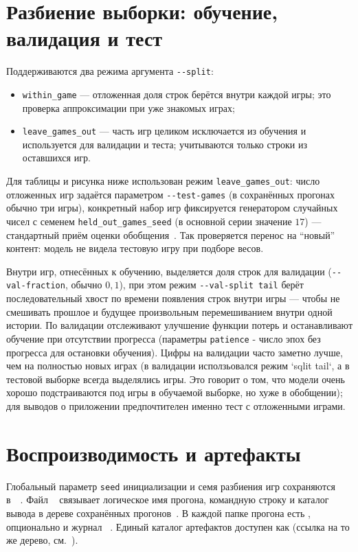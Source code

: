 \section{Разбиение выборки: обучение, валидация и тест}

Поддерживаются два режима аргумента \texttt{-{}-split}:

\begin{itemize}
	\item \texttt{within\_game} --- отложенная доля строк берётся внутри каждой игры; это проверка аппроксимации при уже знакомых играх;
	\item \texttt{leave\_games\_out} --- часть игр целиком исключается из обучения и используется для валидации и теста; учитываются только строки из оставшихся игр.
\end{itemize}

Для таблицы и рисунка ниже использован режим \texttt{leave\_games\_out}: число отложенных игр задаётся параметром \texttt{-{}-test-games} (в сохранённых прогонах обычно три игры), конкретный набор игр фиксируется генератором случайных чисел с семенем \texttt{held\_out\_games\_seed} (в основной серии значение $17$) --- стандартный приём оценки обобщения~\cite{nikolenko2018}. Так проверяется перенос на ``новый'' контент: модель не видела тестовую игру при подборе весов.

Внутри игр, отнесённых к обучению, выделяется доля строк для валидации (\texttt{-{}-val-fraction}, обычно $0{,}1$), при этом режим \texttt{-{}-val-split tail} берёт последовательный хвост по времени появления строк внутри игры --- чтобы не смешивать прошлое и будущее произвольным перемешиванием внутри одной истории. По валидации отслеживают улучшение функции потерь и останавливают обучение при отсутствии прогресса (параметры \texttt{patience} - число эпох без прогресса для остановки обучения). Цифры на валидации часто заметно лучше, чем на полностью новых играх (в валидации исползьовался режим `sqlit tail`, а в тестовой выборке всегда выделялись игры. Это говорит о том, что модели очень хорошо подстраиваются под игры в обучаемой выборке, но хуже в обобщении); для выводов о приложении предпочтителен именно тест с отложенными играми.

\section{Воспроизводимость и артефакты}

\begin{sloppypar}
Глобальный параметр \texttt{seed} инициализации и семя разбиения игр сохраняются в~~. Файл ~ связывает логическое имя прогона, командную строку и каталог вывода в дереве сохранённых прогонов~. В каждой папке прогона есть , опционально  и журнал ~. Единый каталог артефактов доступен как  (ссылка на то же дерево, см.~).
\end{sloppypar}

